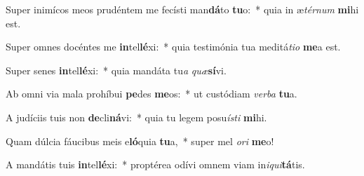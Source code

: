 \item Super inimícos meos prudéntem me fecísti man\textbf{dá}to \textbf{tu}o:~* quia in æ\textit{tér}\textit{num} \textbf{mi}hi est.
\item Super omnes docéntes me \textbf{in}tel\textbf{lé}xi:~* quia testimónia tua meditá\textit{ti}\textit{o} \textbf{me}a est.
\item Super senes \textbf{in}tel\textbf{lé}xi:~* quia mandáta tu\textit{a} \textit{quæ}\textbf{sí}vi.
\item Ab omni via mala prohíbui \textbf{pe}des \textbf{me}os:~* ut custódiam \textit{ver}\textit{ba} \textbf{tu}a.
\item A judíciis tuis non \textbf{de}cli\textbf{ná}vi:~* quia tu legem posu\textit{ís}\textit{ti} \textbf{mi}hi.
\item Quam dúlcia fáucibus meis e\textbf{ló}quia \textbf{tu}a,~* super mel \textit{o}\textit{ri} \textbf{me}o!
\item A mandátis tuis \textbf{in}tel\textbf{lé}xi:~* proptérea odívi omnem viam in\textit{i}\textit{qui}\textbf{tá}tis.
